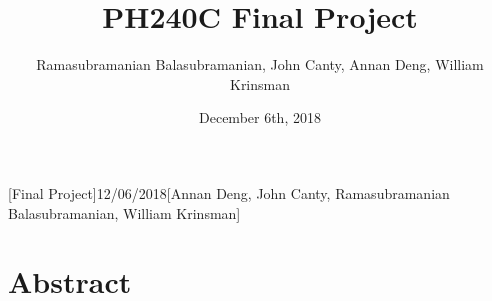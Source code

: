 



\newcommand{\Pval}{\operatorname{Pval}}
\newcommand{\AD}{\operatorname{AD}}
\newcommand{\PD}{\operatorname{PD}}
\newcommand{\ADPD}{\operatorname{ADPD}}
\newcommand{\Ctl}{\operatorname{Ctl}}


\headerfooter{}[Final Project]{}{12/06/2018}[Annan Deng, John Canty, Ramasubramanian Balasubramanian, William Krinsman]

\newcommand{\code}[1]{\mbox{\texttt{#1}}}


\renewcommand{\thesubsection}{ \arabic{subsection}.}
\renewcommand{\thesubsubsection}{(\alph{subsubsection})}




\title{PH240C Final Project \break{} \break {} }
\date{December 6th, 2018}
\author{Ramasubramanian Balasubramanian, John Canty, Annan Deng, William Krinsman}

\maketitle

\section*{Abstract}
\label{sec:abstract}

